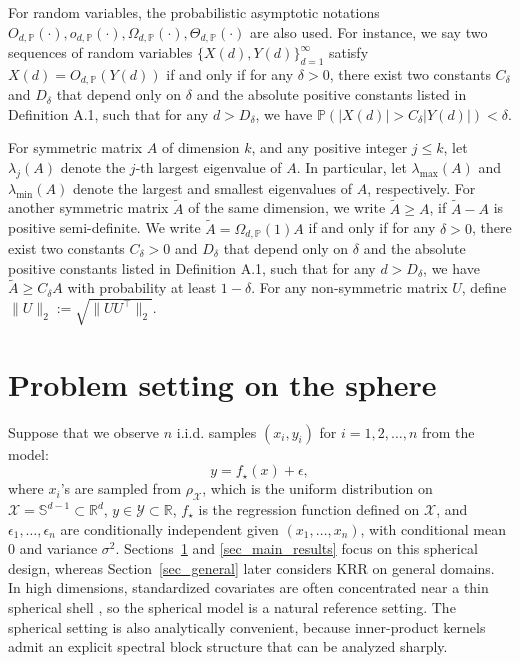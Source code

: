 \documentclass{article}
\theoremstyle{plain}
\theoremstyle{definition}
\theoremstyle{remark}
\newcommand{\bbR}{\mathbb{R}}
\newcommand{\calX}{\mathcal{X}}
\begin{document}
For random variables, the probabilistic asymptotic notations $O_{d, \mathbb{P}}(\cdot), o_{d, \mathbb{P}}(\cdot), \Omega_{d, \mathbb{P}}(\cdot), \Theta_{d, \mathbb{P}}(\cdot)$ are also used. For instance, we say two sequences of random variables $\{X(d), Y(d)\}_{d=1}^{\infty}$ satisfy $ X(d) =  O_{d, \mathbb{P}}(Y(d)) $ if and only if for any $\delta > 0$, there exist two constants $C_{\delta} $ and $ D_{\delta}$ that depend only on $\delta$ and the absolute positive constants listed in Definition A.1,  such that for any $d > D_{\delta}$, we have $\mathbb{P}\left( |X(d)| > C_{\delta} |Y(d)| \right) < \delta$.

For symmetric matrix \( A\) of dimension \( k \), and any positive integer \( j \leq k \), let \( \lambda_j(A) \) denote the \( j \)-th largest eigenvalue of \( A \). 
In particular, let \( \lambda_{\text{max}}(A) \) and \( \lambda_{\text{min}}(A) \) denote the largest and smallest eigenvalues of \( A \), respectively. 
For another symmetric matrix \( \tilde{A} \) of the same dimension, we write $\tilde{A}\geq A$, if $\tilde{A}-A$ is positive semi-definite. 
We write $\tilde{A}=\Omega_{d, \mathbb{P}}(1) A$ if and only if for any $\delta > 0$, there exist two constants $C_{\delta}>0$ and $ D_{\delta}$ that depend only on $\delta$ and the absolute positive constants listed in Definition A.1,  such that for any $d > D_{\delta}$, we have $\tilde{A} \geq C_{\delta}A$ with probability at least $1-\delta$.
For any non-symmetric matrix $U$, define $\|U\|_{2} := \sqrt{\|UU^{\top}\|_{2}}$.









\section{Problem setting on the sphere}\label{sec_settings}




Suppose that we observe $n$ i.i.d. samples $(x_i, y_i)$ for $i =1,2,\ldots, n$ from the model:
\begin{equation}\label{equation:true_model}
    y=f_{\star}(x)+\epsilon,
\end{equation}
where $x_i$'s are sampled from $\rho_{\calX}$, which is the uniform distribution on $\mathcal{X} =\mathbb{S}^{d-1}\subset \bbR^{d}$,
$y \in \mathcal{Y} \subset \mathbb{R}$,
$f_{\star}$ is the regression function defined on $\mathcal{X}$, and  $\epsilon_1, \ldots, \epsilon_n$ are conditionally independent given $(x_1, \ldots, x_n)$, with conditional mean 0 and variance $\sigma^2$. 
Sections~\ref{sec_settings} and \ref{sec_main_results} focus on this spherical design, whereas Section~\ref{sec_general} later considers KRR on general domains. 
In high dimensions, standardized covariates are often concentrated near a thin spherical shell \citep{talagrand1996new}, so the spherical model is a natural reference setting. 
The spherical setting is also analytically convenient, because inner-product kernels admit an explicit spectral block structure that can be analyzed sharply.
\end{document}
